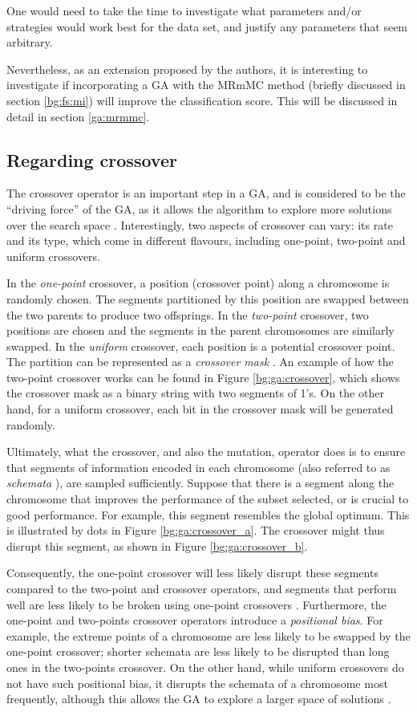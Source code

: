 \documentclass[12pt, twoside, a4paper]{report}
\begin{document}
One would need to take the time to investigate what parameters and/or strategies would work best for the data set, and justify any parameters that seem arbitrary.

Nevertheless, as an extension proposed by the authors, it is interesting to investigate if incorporating a GA with the MRmMC method (briefly discussed in section \ref{bg:fs:mi})  will improve the classification score. This will be discussed in detail in section \ref{ga:mrmmc}.

\subsection{Regarding crossover}
The crossover operator is an important step in a GA, and is considered to be the ``driving force'' of the GA, as it allows the algorithm to explore more solutions over the search space \cite{RefWorks:223, RefWorks:226}. Interestingly, two aspects of crossover can vary: its rate and its type, which come in different flavours, including one-point, two-point and uniform crossovers.

In the \textit{one-point} crossover, a position (crossover point) along a chromosome is randomly chosen. The segments partitioned by this position are swapped between the two parents to produce two offsprings. In the \textit{two-point} crossover, two positions are chosen and the segments in the parent chromosomes are similarly swapped. In the \textit{uniform} crossover, each position is a potential crossover point. The partition can be represented as a \textit{crossover mask} \cite{RefWorks:205}. An example of how the two-point crossover works can be found in Figure \ref{bg:ga:crossover}, which shows the crossover mask as a binary string with two segments of 1's. On the other hand, for a uniform crossover, each bit in the crossover mask will be generated randomly.

Ultimately, what the crossover, and also the mutation, operator does is to ensure that segments of information encoded in each chromosome (also referred to as \textit{schemata} \cite{RefWorks:224}), are sampled sufficiently. Suppose that there is a segment along the chromosome that improves the performance of the subset selected, or is crucial to good performance. For example, this segment resembles the global optimum. This is illustrated by dots in Figure \ref{bg:ga:crossover_a}. The crossover might thus disrupt this segment, as shown in Figure \ref{bg:ga:crossover_b}.

Consequently, the one-point crossover will less likely disrupt these segments compared to the two-point and crossover operators, and segments that perform well are less likely to be broken using one-point crossovers \cite{RefWorks:224}. Furthermore, the one-point and two-points crossover operators introduce a \textit{positional bias}. For example, the extreme points of a chromosome are less likely to be swapped by the one-point crossover; shorter schemata are less likely to be disrupted than long ones in the two-points crossover. On the other hand, while uniform crossovers do not have such positional bias, it disrupts the schemata of a chromosome most frequently, although this allows the GA to explore a larger space of solutions \cite{RefWorks:224}.
\end{document}
